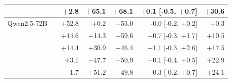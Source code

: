\begin{tabular}{llrrrrr}
 & \fmtBefore{} & +2.8 & +65.1 & +68.1 & +0.1 \tiny[-0.5, +0.7] & +30.6 \\
\midrule
Qwen2.5-72B & \fmtLetter{} & +52.8 & +0.2 & +53.0 & -0.0 \tiny[-0.2, +0.2] & +0.3 \\
 & \fmtOpt{} & +44.6 & +14.3 & +59.6 & +0.7 \tiny[-0.3, +1.7] & +10.5 \\
 & \fmtPost{} & +14.4 & +30.9 & +46.4 & +1.1 \tiny[-0.3, +2.6] & +17.5 \\
 & \fmtNone{} & +3.1 & +47.7 & +50.9 & +0.1 \tiny[-0.4, +0.5] & +22.9 \\
 & \fmtBefore{} & -1.7 & +51.2 & +49.8 & +0.3 \tiny[-0.2, +0.7] & +24.1 \\
\bottomrule
\end{tabular}
